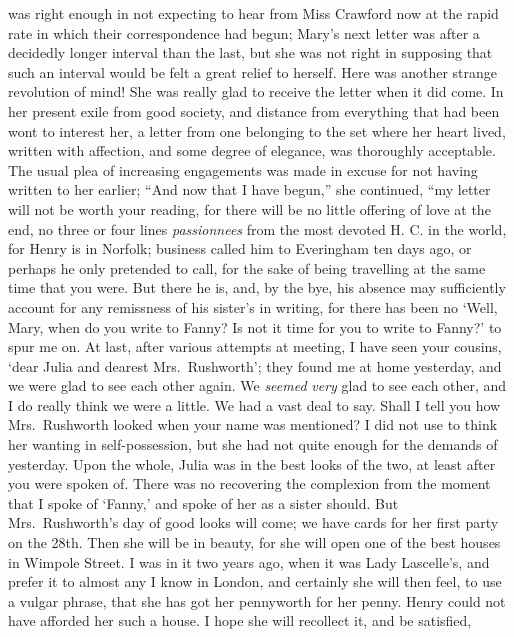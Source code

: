  was right enough in not expecting to hear from Miss
Crawford now at the rapid rate in which their correspondence
had begun; Mary's next letter was after a decidedly longer
interval than the last, but she was not right in supposing
that such an interval would be felt a great relief
to herself.  Here was another strange revolution of mind!
She was really glad to receive the letter when it did come.
In her present exile from good society, and distance from
everything that had been wont to interest her, a letter
from one belonging to the set where her heart lived,
written with affection, and some degree of elegance,
was thoroughly acceptable.  The usual plea of increasing
engagements was made in excuse for not having
written to her earlier; ``And now that I have begun,''
she continued, ``my letter will not be worth your reading,
for there will be no little offering of love at the end,
no three or four lines \emph{passionnees} from the most
devoted H. C. in the world, for Henry is in Norfolk;
business called him to Everingham ten days ago,
or perhaps he only pretended to call, for the sake of being
travelling at the same time that you were.  But there
he is, and, by the bye, his absence may sufficiently account
for any remissness of his sister's in writing, for there
has been no `Well, Mary, when do you write to Fanny?
Is not it time for you to write to Fanny?' to spur me on.
At last, after various attempts at meeting, I have seen
your cousins, `dear Julia and dearest Mrs.\ Rushworth';
they found me at home yesterday, and we were glad to
see each other again.  We \emph{seemed} \emph{very} glad to see
each other, and I do really think we were a little.
We had a vast deal to say.  Shall I tell you how
Mrs.\ Rushworth looked when your name was mentioned?
I did not use to think her wanting in self-possession,
but she had not quite enough for the demands of yesterday.
Upon the whole, Julia was in the best looks of the two,
at least after you were spoken of.  There was no
recovering the complexion from the moment that I spoke
of `Fanny,' and spoke of her as a sister should.
But Mrs.\ Rushworth's day of good looks will come;
we have cards for her first party on the 28th.  Then she
will be in beauty, for she will open one of the best
houses in Wimpole Street.  I was in it two years ago,
when it was Lady Lascelle's, and prefer it to almost
any I know in London, and certainly she will then feel,
to use a vulgar phrase, that she has got her pennyworth
for her penny.  Henry could not have afforded her such
a house.  I hope she will recollect it, and be satisfied,
